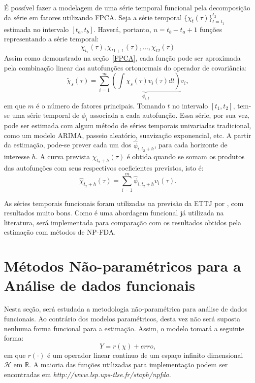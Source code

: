 \documentclass[
	12pt,				%
	openright,			%
	oneside,			%
	a4paper,			%
	english,			%
	brazil				%
	]{dissertacao-ufrgs-abntex2}
\begin{document}
É possível fazer a modelagem de uma série temporal funcional pela decomposição da série em fatores utilizando FPCA. Seja a série temporal $\{ \chi_t(\tau) \}_{t=t_1}^{t_2}$ estimada no  intervalo $[t_a,t_b]$. Haverá, portanto, $n=t_b-t_a+1$ funções representando a série temporal:
\begin{equation}
\chi_{t_1}(\tau), \chi_{t1+1}(\tau), \dots, \chi_{t2}(\tau)
\end{equation}
Assim como demonstrado na seção~\ref{FPCA}, cada função pode ser aproximada pela combinação linear das autofunções ortonormais do operador de covariância:
\begin{equation}
\widetilde{\chi}_s(\tau)=\sum_{i=1}^{m}{ \underbrace{ \left(  \int \chi_s(\tau)  v_i(\tau)dt \right) }_{\phi_{i,t}} } v_i,
\end{equation}
em que $m$ é o número de fatores principais.
Tomando $t$ no intervalo $[t_1,t_2]$, tem-se uma série temporal de $\phi_i$ associada a cada autofunção. Essa série, por sua vez, pode ser estimada com algum método de séries temporais univariadas tradicional, como um modelo ARIMA, passeio aleatório, suavização exponencial, etc. A partir da estimação, pode-se prever cada um dos $\hat{\phi}_{i,t_2+h}$, para cada horizonte de interesse $h$. A curva prevista $\chi_{t_2+h}(\tau)$ é obtida quando se somam os produtos das autofunções com seus respectivos coeficientes previstos, isto é:
\begin{equation}
\hat{\chi}_{t_2+h}(\tau)= \sum_{i=1}^{m}{\hat{\phi}_{i,t_2+h} v_i(\tau) }.
\end{equation}

As séries temporais funcionais foram utilizadas na previsão da ETTJ por , com resultados muito bons. Como é uma abordagem funcional já utilizada na literatura, será implementada para comparação com os resultados obtidos pela estimação com métodos de NP-FDA.

\section{Métodos Não-paramétricos para a Análise de dados funcionais}

Nesta seção, será estudada a metodologia não-paramétrica para análise
de dados funcionais. Ao contrário dos modelos paramétricos, desta
vez não será suposta nenhuma forma funcional para a estimação. Assim,
o modelo tomará a seguinte forma:
\[
Y=r(\chi)+erro,
\]
em que $r(\cdot)$ é um operador linear contínuo de um espaço infinito dimensional $\mathcal{H}$
em $\mathbb{R}$. A maioria das funções utilizadas para implementação
podem ser encontradas em \emph{http://www.lsp.ups-tlse.fr/staph/npfda. }
\end{document}
